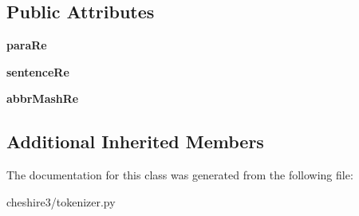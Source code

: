 \subsection*{Public Attributes}
\begin{DoxyCompactItemize}
\item 
\hypertarget{classcheshire3_1_1tokenizer_1_1_sentence_tokenizer_a438eba75ac1eed8a6a32bba61f2f8b6a}{{\bfseries para\-Re}}\label{classcheshire3_1_1tokenizer_1_1_sentence_tokenizer_a438eba75ac1eed8a6a32bba61f2f8b6a}

\item 
\hypertarget{classcheshire3_1_1tokenizer_1_1_sentence_tokenizer_a7b11f629f7b04cce765c17c92c56bc75}{{\bfseries sentence\-Re}}\label{classcheshire3_1_1tokenizer_1_1_sentence_tokenizer_a7b11f629f7b04cce765c17c92c56bc75}

\item 
\hypertarget{classcheshire3_1_1tokenizer_1_1_sentence_tokenizer_aea323b78ba087b477d2de2576e173fe6}{{\bfseries abbr\-Mash\-Re}}\label{classcheshire3_1_1tokenizer_1_1_sentence_tokenizer_aea323b78ba087b477d2de2576e173fe6}

\end{DoxyCompactItemize}
\subsection*{Additional Inherited Members}


The documentation for this class was generated from the following file\-:\begin{DoxyCompactItemize}
\item 
cheshire3/tokenizer.\-py\end{DoxyCompactItemize}
